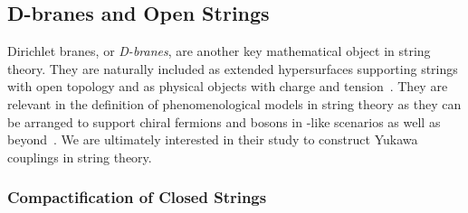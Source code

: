 \subsection{D-branes and Open Strings}

Dirichlet branes, or \emph{D-branes}, are another key mathematical object in string theory.
They are naturally included as extended hypersurfaces supporting strings with open topology and as physical objects with charge and tension~\cite{Polchinski:1995:DirichletBranesRamondRamond,Polchinski:1996:TASILecturesDBranes,DiVecchia:1999:DbranesStringTheory,DiVecchia:2000:BranesStringTheory,DiVecchia:1997:ClassicalPbranesBoundary}.
They are relevant in the definition of phenomenological models in string theory as they can be arranged to support chiral fermions and bosons in \sm-like scenarios as well as beyond~\cite{Honecker:2012:FieldTheoryStandard,Lust:2009:LHCStringHunter}.
We are ultimately interested in their study to construct Yukawa couplings in string theory.


\subsubsection{Compactification of Closed Strings}

